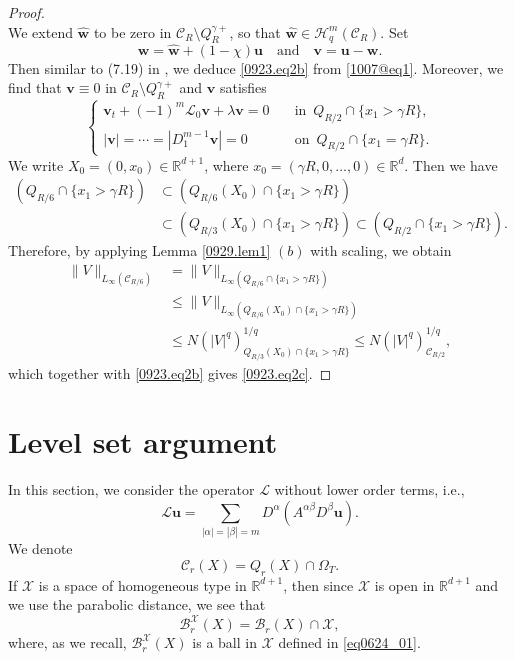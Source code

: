 \documentclass[reqno]{amsart}
\numberwithin{equation}{section}
\theoremstyle{plain}
\theoremstyle{definition}
\theoremstyle{remark}
\begin{document}
\begin{proof}
\begin{equation}
\end{equation}
We extend $\hat{{\boldsymbol{w}}}$ to be zero in ${\mathcal{C}}_R \setminus Q^{\gamma+}_R$, so that $\hat{{\boldsymbol{w}}}\in {\mathcal{H}}^m_q({\mathcal{C}}_R)$.
Set
\[
{\boldsymbol{w}}=\hat{{\boldsymbol{w}}}+(1-\chi){\boldsymbol{u}} \quad \text{and}\quad {\boldsymbol{v}}={\boldsymbol{u}}-{\boldsymbol{w}}.
\]
Then similar to (7.19) in \cite{MR2835999}, we deduce \eqref{0923.eq2b} from \eqref{1007@eq1}.
Moreover, we find that
${\boldsymbol{v}}\equiv 0$ in ${\mathcal{C}}_R\setminus Q^{\gamma+}_R$ and ${\boldsymbol{v}}$ satisfies
$$
\left\{
\begin{aligned}
{\boldsymbol{v}}_t+(-1)^m{\mathcal{L}}_0{\boldsymbol{v}}+\lambda{\boldsymbol{v}}=0 &\quad \text{in }\, Q_{R/2}\cap \{x_1>\gamma R\},\\
|{\boldsymbol{v}}|=\cdots=|D^{m-1}_1{\boldsymbol{v}}|=0 &\quad \text{on }\, Q_{R/2}\cap \{x_1=\gamma R\}.
\end{aligned}
\right.
$$
We write $X_0=(0,x_0)\in {\mathbb{R}}^{d+1}$, where $x_0=(\gamma R, 0,\ldots,0)\in {\mathbb{R}}^d$. 
Then we have 
\begin{align*}
(Q_{R/6}\cap \{x_1>\gamma R\}) &\subset (Q_{R/6}(X_0)\cap \{x_1>\gamma R\})\\
&\subset (Q_{R/3}(X_0)\cap \{x_1>\gamma R\})\subset (Q_{R/2}\cap \{x_1>\gamma R\}).
\end{align*}
Therefore, by applying Lemma \ref{0929.lem1} $(b)$ with scaling, we obtain 
\begin{align*}
\|V\|_{L_\infty({\mathcal{C}}_{R/6})}&=\|V\|_{L_\infty(Q_{R/6}\cap \{x_1>\gamma R\})}\\
&\le \|V\|_{L_\infty(Q_{R/6}(X_0)\cap \{x_1>\gamma R\})}\\
&\le N(|V|^q)^{1/q}_{Q_{R/3}(X_0)\cap \{x_1>\gamma R\}}\le N(|V|^q)^{1/q}_{{\mathcal{C}}_{R/2}},
\end{align*}
which together with \eqref{0923.eq2b} gives \eqref{0923.eq2c}.
\end{proof}

\section{Level set argument}		

In this section, we consider the operator ${\mathcal{L}}$ without lower order terms, i.e.,
\[
{\mathcal{L}} {\boldsymbol{u}}=\sum_{|\alpha|=|\beta|=m}D^\alpha(A^{\alpha\beta}D^\beta {\boldsymbol{u}}).
\]
We denote 
\begin{equation}		\label{160617@eq2}
{\mathcal{C}}_r(X)=Q_r(X)\cap \Omega_T.
\end{equation}
If ${\mathcal{X}}$ is a space of homogeneous type in ${\mathbb{R}}^{d+1}$, then since ${\mathcal{X}}$ is open in ${\mathbb{R}}^{d+1}$ and we use the parabolic distance, we see that
$$
{\mathcal{B}}_r^{\mathcal{X}}(X)={\mathcal{B}}_r(X)\cap {\mathcal{X}},
$$
where, as we recall, ${\mathcal{B}}_r^{\mathcal{X}}(X)$ is a ball in ${\mathcal{X}}$ defined in \eqref{eq0624_01}.
\end{document}
